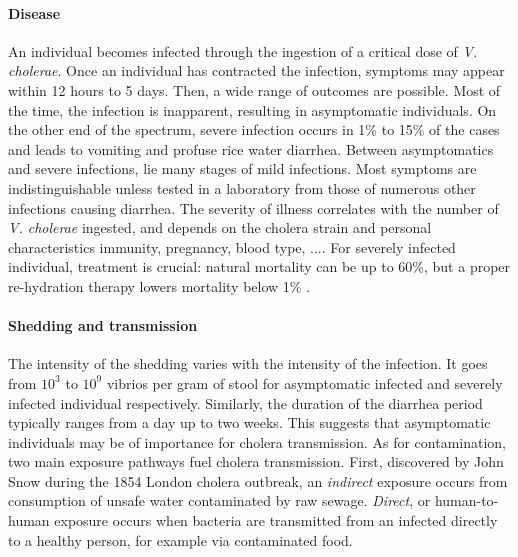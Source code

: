 \paragraph{Disease} An individual becomes infected through the ingestion of a critical dose of \emph{V. cholerae}\cite{Kaper:Cholera:1995,Nelson:CholeraTransmissionHost:2009}.
Once an individual has contracted the infection, symptoms may appear within 12 hours to 5 days\cite{Azman:IncubationPeriodCholera:2013}. Then, a wide range of outcomes are possible. Most of the time, the infection is inapparent, resulting in asymptomatic individuals. On the other end of the spectrum, severe infection occurs in 1\% to 15\% of the cases and leads to vomiting and profuse rice water diarrhea. Between asymptomatics and severe infections, lie many stages of mild infections.  Most symptoms are indistinguishable unless tested in a laboratory from those of numerous other infections causing diarrhea\cite{King:InapparentInfectionsCholera:2008, Kaper:Cholera:1995, Nelson:CholeraTransmissionHost:2009, van_de_linde_observations_1965,Mccormack:CommunityStudyInapparent:1969}.  The severity of illness correlates with the number of \textit{V. cholerae} ingested\cite{Brouwer:DoseresponseRelationshipsEnvironmentally:2017}, and depends on the cholera strain and personal characteristics immunity, pregnancy, blood type, ...\cite{WHO:CholeraVaccinesWHO:2017}. For severely infected individual, treatment is crucial: natural mortality can be up to 60\%, but a proper re-hydration therapy lowers mortality below 1\%\cite{Luquero:MortalityRatesCholera:2016} .   


\paragraph{Shedding and transmission} The intensity of the shedding varies with the intensity of the infection. It goes from $10^3$ to $10^{9}$ vibrios per gram of stool for asymptomatic infected and severely infected individual respectively\cite{Nelson:CholeraTransmissionHost:2009}. Similarly, the duration of the diarrhea period typically ranges from a day up to two weeks\cite{Nelson:CholeraTransmissionHost:2009, Kaper:Cholera:1995}.
This suggests that asymptomatic individuals may be of importance for cholera transmission. As for contamination, two main exposure pathways fuel cholera transmission. First, discovered by John Snow during the 1854 London cholera outbreak, an \textit{indirect} exposure occurs from consumption of unsafe water contaminated by raw sewage\cite{Snow:ModeCommunicationCholera:1855}.
\textit{Direct}, or human-to-human exposure occurs when bacteria are transmitted from an infected directly to a healthy person, for example via contaminated food.%

